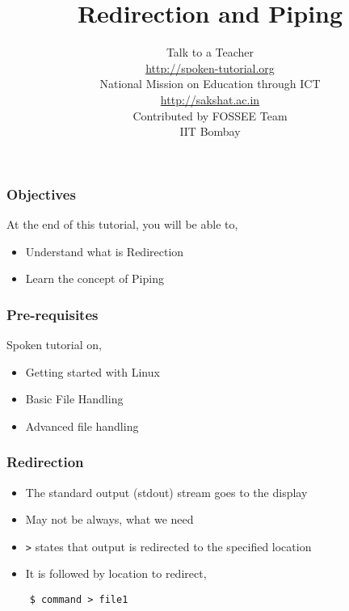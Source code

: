 \documentclass[17pt,compress]{beamer}
\author[FOSSEE]{}
\institute[IIT Bombay]{}
\date[]{}
\begin{document}
\sffamily \bfseries
\title
[Redirection and Piping]
{Redirection and Piping}
\author
[FOSSEE]
{\small Talk to a Teacher\\{\color{blue}\url{http://spoken-tutorial.org}}\\\vspace{0.25cm}National Mission on Education
 through ICT\\{\color{blue}\url{ http://sakshat.ac.in}} \\ [1.65cm]
   Contributed by FOSSEE Team \\IIT Bombay  \\[0.3cm]
}

\begin{frame}
   \titlepage
\end{frame}

\begin{frame}
\frametitle{Objectives}
\label{sec-2}

At the end of this tutorial, you will be able to,
\begin{itemize}
\item Understand what is Redirection
\item Learn the concept of Piping
\end{itemize}
\end{frame}

\begin{frame}
\frametitle{Pre-requisites}
\label{sec-3}

Spoken tutorial on,
\begin{itemize}
\item Getting started with Linux
\item Basic File Handling
\item Advanced file handling
\end{itemize}
\end{frame}

\begin{frame}[fragile]
  \frametitle{Redirection} 

  \begin{itemize}
  \item The standard output (stdout) stream goes to the display
  \item May not be always, what we need
  \item \texttt{>} states that output is redirected to the specified location 
  \item It is followed by location to redirect,
  \end{itemize}
  \begin{lstlisting}
    $ command > file1
  \end{lstlisting} %
\end{frame}
\end{document}

